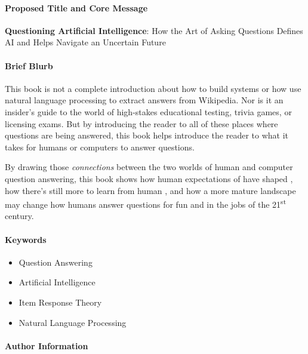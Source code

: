 
\clearpage

\paragraph{Proposed Title and Core Message} \vspace{3cm}

{\bf Questioning Artificial Intelligence}: How the Art of Asking Questions Defines AI and Helps Navigate an Uncertain Future

\vspace{3cm}


\paragraph{Brief Blurb}

This book is not a complete introduction about how to build  systems
or how use natural language processing to extract answers from Wikipedia.
%
Nor is it an insider's guide to the world of high-stakes educational testing,
trivia games, or licensing exams.
%
But by introducing the reader to all of these places where questions
are being answered, this book helps introduce the reader to what it
takes for humans or computers to answer questions. 

By drawing those \emph{connections} between the two worlds of human
and computer question answering, this book shows how human
expectations of  have shaped , how there's still more
to learn from human , and how a more mature  landscape
may change how humans answer questions for fun and in the jobs of the
21\textsuperscript{st} century.

\paragraph{Keywords}

\begin{itemize}
\item Question Answering
\item Artificial Intelligence
\item Item Response Theory
  \item Natural Language Processing
\end{itemize}

\paragraph{Author Information}

